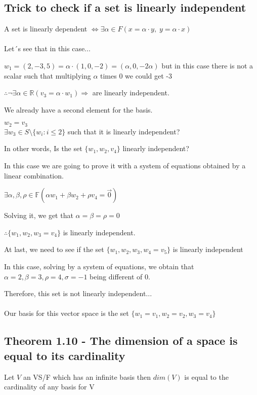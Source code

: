 \documentclass{article}
\begin{document}
\subsection*{Trick to check if a set is linearly independent}

A set is linearly dependent \(\iff \exists \alpha \in F (x = \alpha \cdot y,\;y = \alpha \cdot x)\)
\\
\\
Let´s see that in this case...

\(w_1 = (2,-3,5) = \alpha \cdot (1,0,-2) = (\alpha, 0 , -2 \alpha)\) but in this case there is not a scalar such that multiplying \(\alpha\) times 0 we could get -3

\(\therefore \neg \exists \alpha \in \mathbb{R} (v_3 = \alpha \cdot w_1) \Rightarrow\) are linearly independent.

We already have a second element for the basis.

\(w_2 = v_3\)
\\

\(\exists w_3 \in S\text{\textbackslash}\{w_i : i \leq 2\}\) such that it is linearly independent?

In other words, Is the set \(\{w_1, w_2, v_4\}\) linearly independent?

In this case we are going to prove it with a system of equations obtained by a linear combination.

\(\exists \alpha, \beta, \rho \in \mathbb{F} (\alpha w_1 + \beta w_2 + \rho v_4 = \vec{0})\)

Solving it, we get that \(\alpha = \beta = \rho = 0\)

\(\therefore \{w_1, w_2, w_3 = v_4\}\) is linearly independent.

At last, we need to see if the set \(\{w_1, w_2, w_3, w_4 = v_5\}\) is linearly independent

In this case, solving by a system of equations, we obtain that \(\alpha = 2, \beta = 3, \rho = 4, \sigma = -1\) being different of 0.

Therefore, this set is not linearly independent...
\\
\\
Our basis for this vector space is the set \(\{w_1 = v_1, w_2 = v_2, w_3 = v_4\}\)

\subsection*{Theorem 1.10 - The dimension of a space is equal to its cardinality}
Let \(V\) an VS/F which has an infinite basis then \(dim(V)\) is equal to the cardinality of any basis for V
\end{document}
